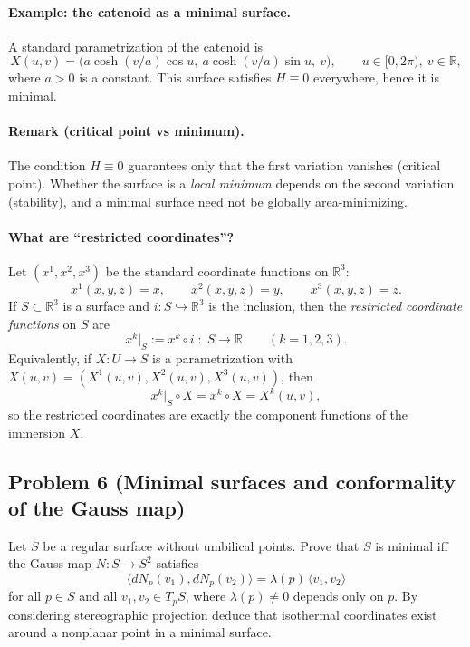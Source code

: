 \documentclass[12pt,a4paper]{article}
\theoremstyle{plain}
\theoremstyle{definition}      %
\begin{document}
\medskip
\paragraph{Example: the catenoid as a minimal surface.}
A standard parametrization of the catenoid is
\[
X(u,v)=\bigl(a\cosh(v/a)\cos u,\ a\cosh(v/a)\sin u,\ v\bigr),
\qquad u\in[0,2\pi),\ v\in\mathbb{R},
\]
where $a>0$ is a constant. This surface satisfies $H\equiv 0$ everywhere, hence it is minimal.

\medskip
\paragraph{Remark (critical point vs minimum).}
The condition $H\equiv 0$ guarantees only that the first variation vanishes (critical point).
Whether the surface is a \emph{local minimum} depends on the second variation (stability), and a minimal surface
need not be globally area-minimizing.



\paragraph{What are ``restricted coordinates''?}
Let $(x^1,x^2,x^3)$ be the standard coordinate functions on $\mathbb{R}^3$:
\[
x^1(x,y,z)=x,\qquad x^2(x,y,z)=y,\qquad x^3(x,y,z)=z.
\]
If $S\subset\mathbb{R}^3$ is a surface and $i:S\hookrightarrow \mathbb{R}^3$ is the inclusion,
then the \emph{restricted coordinate functions} on $S$ are
\[
x^k|_S := x^k\circ i \;:\; S\to\mathbb{R}\qquad (k=1,2,3).
\]
Equivalently, if $X:U\to S$ is a parametrization with
$X(u,v)=(X^1(u,v),X^2(u,v),X^3(u,v))$, then
\[
x^k|_S \circ X = x^k\circ X = X^k(u,v),
\]
so the restricted coordinates are exactly the component functions of the immersion $X$.
	
	
\subsection*{Problem 6 (Minimal surfaces and conformality of the Gauss map)}
	Let $S$ be a regular surface without umbilical points. Prove that $S$ is minimal iff the Gauss map
	$N:S\to S^2$ satisfies
	\[
	\langle dN_p(v_1), dN_p(v_2)\rangle = \lambda(p)\,\langle v_1,v_2\rangle
	\]
	for all $p\in S$ and all $v_1,v_2\in T_pS$, where $\lambda(p)\neq 0$ depends only on $p$.
	By considering stereographic projection deduce that isothermal coordinates exist around a nonplanar point
	in a minimal surface.
	
\end{document}
